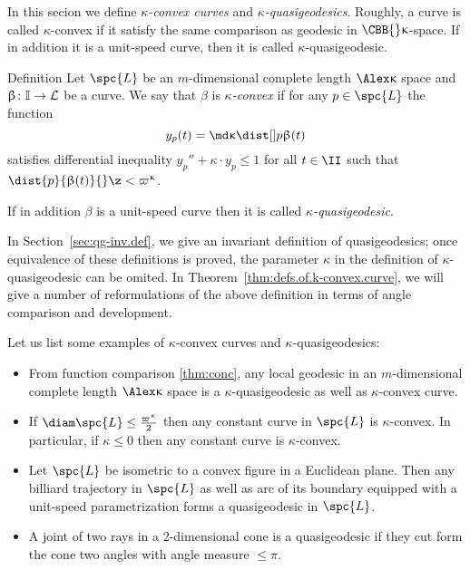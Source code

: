 In this secion we define \emph{$\kappa$-convex curves} and \emph{$\kappa$-quasigeodesics}.
Roughly, a curve is called $\kappa$-convex if it satisfy the same comparison as geodesic in $\CBB{}\kappa$-space.
If in addition it is a unit-speed curve, then it is called $\kappa$-quasigeodesic.

\begin{thm}{Definition}\label{def:k-convex.curve}
Let 
$\spc{L}$ be an $m$-dimensional complete length $\Alex\kappa$ space
and $\beta\:\II\to \spc{L}$ be a curve.
We say that $\beta$ is \emph{$\kappa$-convex} if for any $p\in \spc{L}$ the function
\[y_p(t)=\md\kappa\dist[{{}}]{p}{\beta(t)}{}\] 
satisfies differential inequality $y_p''+\kappa\cdot  y_p\le 1$ for all $t\in\II$ such that $\dist{p}{\beta(t)}{}\z<\varpi\kappa$.

If in addition $\beta$ is a unit-speed curve  then it is called \emph{$\kappa$-quasigeodesic}.
\end{thm}


In Section~\ref{sec:qg-inv.def}, 
we give an invariant definition of quasigeodesics; 
once equivalence of these definitions is proved, the parameter $\kappa$ in the definition of $\kappa$-quasigeodesic can be omited. 
In Theorem~\ref{thm:defs.of.k-convex.curve}, 
we will give a number of reformulations of the above definition in terms of angle comparison and development.

Let us list some examples of $\kappa$-convex curves and $\kappa$-quasigeodesics:
\begin{itemize}
\item From function comparison \ref{thm:conc}, any local geodesic in an $m$-dimensional complete length $\Alex\kappa$ space is a $\kappa$-\nospace quasigeodesic as well as $\kappa$-convex curve.
\item If $\diam \spc{L}\le \tfrac{\varpi\kappa}{2}$ then any constant curve in $\spc{L}$ is $\kappa$-convex.
In particular, if $\kappa\le0$ then any constant curve is $\kappa$-convex.
\item 
Let $\spc{L}$ be isometric to a convex figure in a Euclidean plane.
Then any billiard trajectory in  $\spc{L}$ as well as arc of its boundary equipped with a unit-speed parametrization forms a quasigeodesic in $\spc{L}$.
\item A joint of two rays in a 2-dimensional cone is a quasigeodesic if they cut form the cone two angles with angle measure $\le\pi$. 
\end{itemize}

